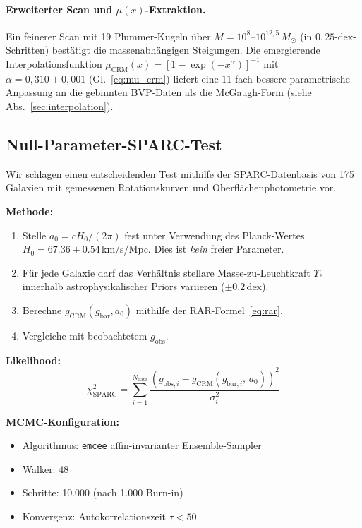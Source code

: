 \documentclass[aps,prd,twocolumn,superscriptaddress,nofootinbib]{revtex4-2}
\begin{document}
\paragraph{Erweiterter Scan und $\mu(x)$-Extraktion.}
Ein feinerer Scan mit 19 Plummer-Kugeln \"uber $M = 10^{8}$--$10^{12{,}5}\,M_\odot$ (in $0{,}25$-dex-Schritten) best\"atigt die massenabh\"angigen Steigungen. Die emergierende Interpolationsfunktion $\mu_{\mathrm{CRM}}(x) = [1 - \exp(-x^\alpha)]^{-1}$ mit $\alpha = 0{,}310 \pm 0{,}001$ (Gl.~\ref{eq:mu_crm}) liefert eine $11$-fach bessere parametrische Anpassung an die gebinnten BVP-Daten als die McGaugh-Form (siehe Abs.~\ref{sec:interpolation}).

\subsection{Null-Parameter-SPARC-Test}
\label{sec:mcmc}

Wir schlagen einen entscheidenden Test mithilfe der SPARC-Datenbasis \cite{Lelli2016} von 175 Galaxien mit gemessenen Rotationskurven und Oberfl\"achenphotometrie vor.

\textbf{Methode:}
\begin{enumerate}
\item Stelle $a_0 = cH_0/(2\pi)$ fest unter Verwendung des Planck-Wertes $H_0 = 67.36 \pm 0.54$\,km/s/Mpc. Dies ist \textit{kein} freier Parameter.
\item F\"ur jede Galaxie darf das Verh\"altnis stellare Masse-zu-Leuchtkraft $\Upsilon_*$ innerhalb astrophysikalischer Priors variieren ($\pm 0.2$\,dex).
\item Berechne $g_{\mathrm{CRM}}(g_{\mathrm{bar}}, a_0)$ mithilfe der RAR-Formel~\eqref{eq:rar}.
\item Vergleiche mit beobachtetem $g_{\mathrm{obs}}$.
\end{enumerate}

\textbf{Likelihood:}
\begin{equation}
\chi^2_{\mathrm{SPARC}} = \sum_{i=1}^{N_{\mathrm{data}}} \frac{\left(g_{\mathrm{obs},i} - g_{\mathrm{CRM}}(g_{\mathrm{bar},i},\, a_0)\right)^2}{\sigma_i^2}
\end{equation}

\textbf{MCMC-Konfiguration:}
\begin{itemize}
\item Algorithmus: \texttt{emcee} affin-invarianter Ensemble-Sampler \cite{ForemanMackey2013}
\item Walker: 48
\item Schritte: 10.000 (nach 1.000 Burn-in)
\item Konvergenz: Autokorrelationszeit $\tau < 50$
\end{itemize}
\end{document}
